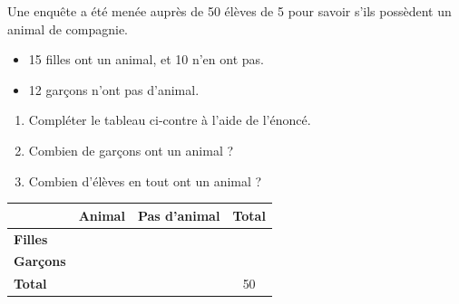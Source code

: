 \documentclass[a4paper]{book}
\begin{document}
    \begin{exercice}
        Une enquête a été menée auprès de 50 élèves de 5 pour savoir s'ils possèdent un animal de compagnie. 
        \begin{itemize}[itemsep=0pt, parsep=0pt, topsep=2pt]
            \item 15 filles ont un animal, et 10 n'en ont pas.
            \item 12 garçons n'ont pas d'animal.
        \end{itemize}
        
        \vspace{0.2cm}
        \noindent
        \begin{minipage}[c]{0.45\textwidth}
            \begin{enumerate}[leftmargin=*, label=\textbf{\arabic*/}, itemsep=0.4cm, parsep=0pt]
                \item Compléter le tableau ci-contre à l'aide de l'énoncé. 
                \item Combien de garçons ont un animal ? \\ 
                \dotfill 
                \item Combien d'élèves en tout ont un animal ? \\ 
                \dotfill
            \end{enumerate}
        \end{minipage}
        \hfill
        \begin{minipage}[c]{0.5\textwidth}
            \begin{center}
                \renewcommand{\arraystretch}{1.5}
                \begin{tabular}{|l|c|c|c|}
                \hline
                 & \textbf{Animal} & \textbf{Pas d'animal} & \textbf{Total} \\
                \hline
                \textbf{Filles} & & & \\
                \hline
                \textbf{Garçons} & & & \\
                \hline
                \textbf{Total} & & & 50 \\
                \hline
                \end{tabular}
            \end{center}
        \end{minipage}
    \end{exercice}
\end{document}
